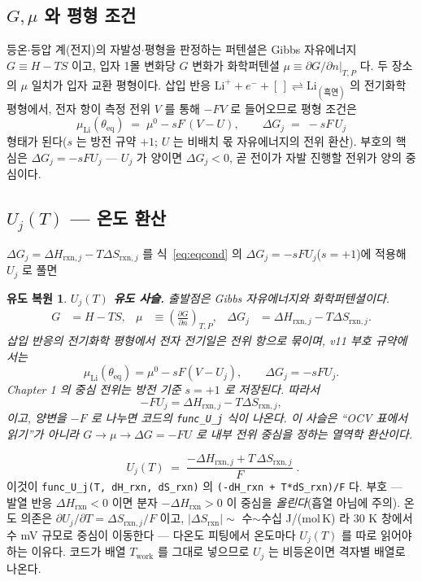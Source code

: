 \documentclass[11pt,a4paper]{article}
\newtheorem*{derivebox}{유도 복원}
\newcommand{\eq}{\mathrm{eq}}
\newcommand{\rxn}{\mathrm{rxn}}
\newcommand{\work}{\mathrm{work}}
\newcommand{\code}[1]{\texttt{#1}}
\begin{document}
\subsection{$G,\mu$ 와 평형 조건}
등온$\cdot$등압 계(전지)의 자발성$\cdot$평형을 판정하는 퍼텐셜은 Gibbs 자유에너지 $G\equiv H-TS$ 이고, 입자 1몰 변화당
$G$ 변화가 화학퍼텐셜 $\mu\equiv\partial G/\partial n|_{T,P}$ 다. 두 장소의 $\mu$ 일치가 입자 교환 평형이다. 삽입 반응
$\mathrm{Li}^++e^-+[\,]\rightleftharpoons\mathrm{Li}_{(\text{흑연})}$ 의 전기화학 평형에서, 전자 항이 측정 전위 $V$ 를
통해 $-FV$ 로 들어오므로 평형 조건은
\begin{equation}
\mu_\mathrm{Li}(\theta_\eq)\;=\;\mu^0-sF\,(V-U),
\qquad \Delta G_j\;=\;-sF\,U_j
\label{eq:eqcond}
\end{equation}
형태가 된다($s$ 는 방전 규약 $+1$; $U$ 는 비배치 몫 자유에너지의 전위 환산). 부호의 핵심은 $\Delta G_j=-sFU_j$ —
$U_j$ 가 양이면 $\Delta G_j<0$, 곧 전이가 자발 진행할 전위가 양의 중심이다.

\subsection{$U_j(T)$ — 온도 환산}
$\Delta G_j=\Delta H_{\rxn,j}-T\Delta S_{\rxn,j}$ 를 식~\eqref{eq:eqcond} 의 $\Delta G_j=-sFU_j$($s=+1$)에 적용해 $U_j$ 로 풀면

\begin{derivebox}
\textbf{$U_j(T)$ 유도 사슬.} 출발점은 Gibbs 자유에너지와 화학퍼텐셜이다.
\begin{align*}
G&=H-TS, & \mu&\equiv\left(\frac{\partial G}{\partial n}\right)_{T,P}, & \Delta G_j&=\Delta H_{\rxn,j}-T\Delta S_{\rxn,j}.
\end{align*}
삽입 반응의 전기화학 평형에서 전자 전기일은 전위 항으로 묶이며, v11 부호 규약에서는
\begin{equation*}
\mu_{\mathrm{Li}}(\theta_{\eq})=\mu^0-sF(V-U_j),\qquad \Delta G_j=-sF U_j.
\end{equation*}
Chapter 1 의 중심 전위는 방전 기준 $s=+1$ 로 저장된다. 따라서
\begin{equation*}
-FU_j=\Delta H_{\rxn,j}-T\Delta S_{\rxn,j},
\end{equation*}
이고, 양변을 $-F$ 로 나누면 코드의 \code{func\_U\_j} 식이 나온다. 이 사슬은 ``OCV 표에서 읽기''가 아니라 $G\to\mu\to\Delta G=-FU$ 로 내부 전위 중심을 정하는 열역학 환산이다.
\end{derivebox}

\begin{equation}
\boxed{\;U_j(T)\;=\;\frac{-\Delta H_{\rxn,j}+T\,\Delta S_{\rxn,j}}{F}\;.}
\label{eq:Uj}
\end{equation}
이것이 \code{func\_U\_j(T, dH\_rxn, dS\_rxn)} 의 \code{(-dH\_rxn + T*dS\_rxn)/F} 다. 부호 — 발열 반응
$\Delta H_\rxn<0$ 이면 분자 $-\Delta H_\rxn>0$ 이 중심을 \emph{올린다}(흡열 아님에 주의). 온도 의존은
$\partial U_j/\partial T=\Delta S_{\rxn,j}/F$ 이고, $|\Delta S_\rxn|\sim$ 수$\sim$수십 J/(mol\,K) 라 $30$ K 창에서 수 mV
규모로 중심이 이동한다 — 다온도 피팅에서 온도마다 $U_j(T)$ 를 따로 읽어야 하는 이유다. 코드가 배열 $T_\work$ 를 그대로
넣으므로 $U_j$ 는 비등온이면 격자별 배열로 나온다.
\end{document}
